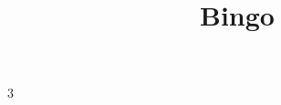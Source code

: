 \documentclass[12pt]{article}
\title{\textbf{Bingo}}
\newcommand{\cartela}[9]{
	
	\vfill 
	
{
	\ttfamily
	
	\begin{tabular}{|| c | c | c ||}
		\hline \hline
		#1 & #2 & #3 \\
		\hline
		#4 & #5 & #6 \\
		\hline
		#7 & #8 & #9 \\
		\hline \hline
	\end{tabular}
}
	
	\vfill 
	
}
\begin{document}

\centering
\begin{multicols}{3}
	

	
	
\end{multicols}

\Huge 
\sffamily
 	


%
\end{document}
